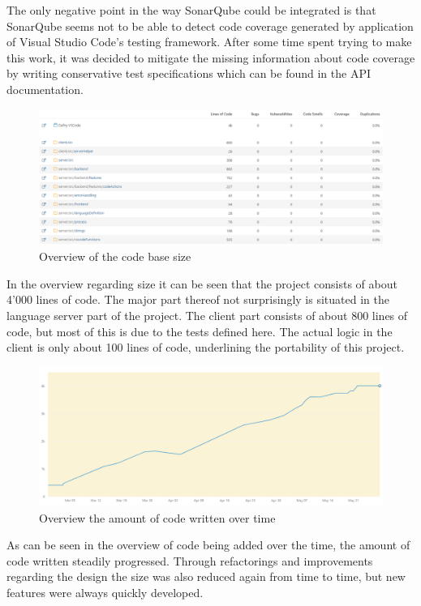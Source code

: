 The only negative point in the way SonarQube could be integrated is that SonarQube seems not to be able to detect code coverage generated by application of Visual Studio Code's testing framework. After some time spent trying to make this work, it was decided to mitigate the missing information about code coverage by writing conservative test specifications which can be found in the API documentation.\newline
\begin{figure}[H]
	\centering
	\includegraphics[width=1\textwidth]{img/sonarSize}
	\caption{Overview of the code base size}
	\label{fig:sonarQubeSizeOverview}
\end{figure}
In the overview regarding size it can be seen that the project consists of about 4'000 lines of code. The major part thereof not surprisingly is situated in the language server part of the project. The client part consists of about 800 lines of code, but most of this is due to the tests defined here. The actual logic in the client is only about 100 lines of code, underlining the portability of this project.\newline
\begin{figure}[H]
	\centering
	\includegraphics[width=1\textwidth]{img/sonarTime}
	\caption{Overview the amount of code written over time}
	\label{fig:sonarQubeTimeOverview}
\end{figure}
As can be seen in the overview of code being added over the time, the amount of code written steadily progressed. Through refactorings and improvements regarding the design the size was also reduced again from time to time, but new features were always quickly developed.\newline
